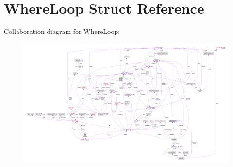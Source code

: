 \hypertarget{structWhereLoop}{}\section{Where\+Loop Struct Reference}
\label{structWhereLoop}


Collaboration diagram for Where\+Loop\+:\nopagebreak
\begin{figure}[H]
\begin{center}
\leavevmode
\includegraphics[width=350pt]{structWhereLoop__coll__graph}
\end{center}
\end{figure}
